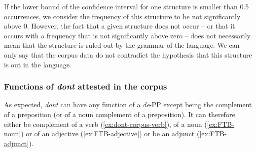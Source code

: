 If the lower bound of the confidence interval for one structure is smaller than 0.5 occurrences, we consider the frequency of this structure to be not significantly above 0. However, the fact that a given structure does not occur -- or that it occurs with a frequency that is not significantly above zero -- does not necessarily mean that the structure is ruled out by the grammar of the language. We can only say that the corpus data do not contradict the hypothesis that this structure is out in the language.

\subsubsection{Functions of \emph{dont} attested in the corpus}
As expected, \emph{dont} can have any function of a \emph{de}-PP except being the complement of a preposition (or of a noun complement of a preposition). It can therefore either be complement of a verb (\ref{ex:dont-corpus-verb}), of a noun (\ref{ex:FTB-noun}) or of an adjective (\ref{ex:FTB-adjective}) or be an adjunct (\ref{ex:FTB-adjunct}).

